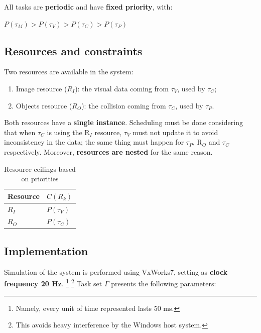 \documentclass{article}
\begin{document}
All tasks are \textbf{periodic} and have \textbf{fixed priority}, with:

\begin{center}
    \emph{$P(\tau_{M}) > P(\tau_{V})> P(\tau_{C})> P(\tau_{P})$}
\end{center}    
\medskip{}

\subsection{Resources and constraints}              \label{resources}

Two resources are available in the system:

\begin{enumerate}
    \item Image resource ($R_{I}$): the visual data coming from $\tau_{V}$, used by $\tau_{C}$;
    \item Objects resource ($R_{O}$): the collision coming from $\tau_{C}$, used by $\tau_{P}$.
\end{enumerate}

Both resources have a \textbf{single instance}. Scheduling must be done considering that when $\tau_{C}$ is using the R$_{I}$ resource, $\tau_{V}$ must not update it to avoid inconsistency in the data; the same thing must happen for $\tau_{P}$, R$_{O}$ and $\tau_{C}$ respectively. Moreover, \textbf{resources are nested} for the same reason.

\begin{table}[H]                                    \label{tab_ceilings}
  \centering
  \begin{tabular}{ll}
     Resource &   $C(R_{k})$\\
     \midrule
    $R_{I}$ &       $P(\tau_{V})$    \\
    $R_{O}$ &       $P(\tau_{C})$    \\
    \bottomrule
  \end{tabular}
  \medskip{}
  \caption{Resource ceilings based on priorities}
  \medskip{}
\end{table}

\subsection{Implementation}                           \label{code}

Simulation of the system is performed using VxWorks7, setting as \textbf{clock frequency 20 Hz}.
\footnote{Namely, every unit of time represented lasts 50 ms.}
\footnote{This avoids heavy interference by the Windows host system.}\newline
Task set $\Gamma$ presents the following parameters:
\end{document}
